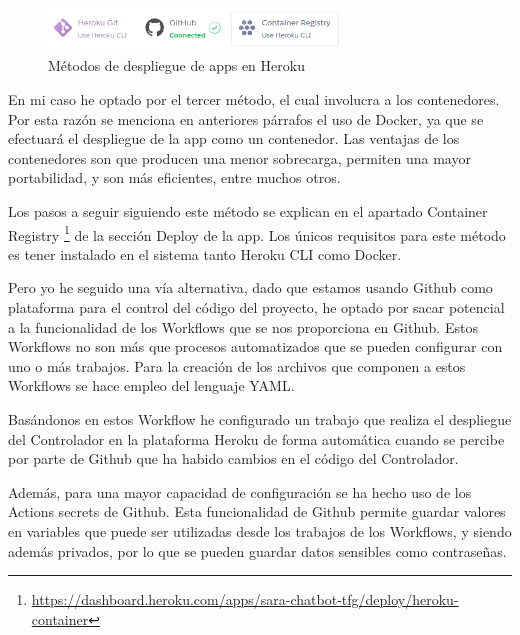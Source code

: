 \begin{figure}[h]
\centering
\includegraphics[width=0.7\textwidth]{imagenes/07_Implementacion/deploy_heroku.png}
\caption{Métodos de despliegue de apps en Heroku}
\label{fig:deploy_heroku}
\end{figure}

En mi caso he optado por el tercer método, el cual involucra a los contenedores. Por esta razón se menciona en anteriores párrafos el uso de Docker, ya que se efectuará el despliegue de la app como un contenedor. Las ventajas de los contenedores son que producen una menor sobrecarga, permiten una mayor portabilidad, y son más eficientes, entre muchos otros.

Los pasos a seguir siguiendo este método se explican en el apartado Container Registry \footnote{\url{https://dashboard.heroku.com/apps/sara-chatbot-tfg/deploy/heroku-container}} de la sección Deploy de la app. Los únicos requisitos para este método es tener instalado en el sistema tanto Heroku CLI como Docker.

Pero yo he seguido una vía alternativa, dado que estamos usando Github como plataforma para el control del código del proyecto, he optado por sacar potencial a la funcionalidad de los Workflows que se nos proporciona en Github. Estos Workflows no son más que procesos automatizados que se pueden configurar con uno o más trabajos. Para la creación de los archivos que componen a estos Workflows se hace empleo del lenguaje YAML.

Basándonos en estos Workflow he configurado un trabajo que realiza el despliegue del Controlador en la plataforma Heroku de forma automática cuando se percibe por parte de Github que ha habido cambios en el código del Controlador.

Además, para una mayor capacidad de configuración se ha hecho uso de los Actions secrets de Github. Esta funcionalidad de Github permite guardar valores en variables que puede ser utilizadas desde los trabajos de los Workflows, y siendo además privados, por lo que se pueden guardar datos sensibles como contraseñas.

